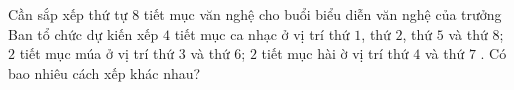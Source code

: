 \begin{bt}%
Cần sắp xếp thứ tự 8 tiết mục văn nghệ cho buổi biểu diễn văn nghệ của trưởng Ban tổ chức dự kiến xếp $4$ tiết mục ca nhạc ở vị trí thứ $1$, thứ $2$, thứ $5$ và thứ $8$; $2$ tiết mục múa ở vị trí thứ $3$ và thứ $6$; $2$ tiết mục hài ờ vị trí thứ $4$ và thứ $7$ . Có bao nhiêu cách xếp khác nhau?
\end{bt}